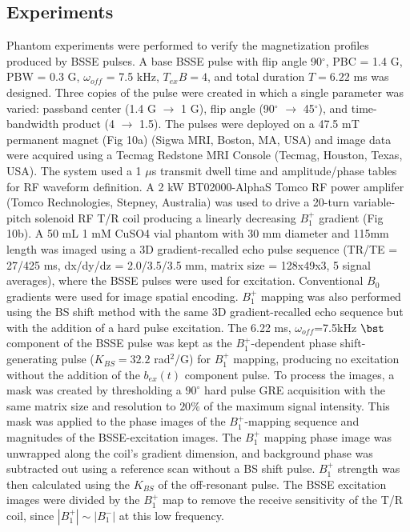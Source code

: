 \documentclass{article}
\newcommand{\bext}{b_{ex}(t)}
\begin{document}
\subsection*{Experiments}
Phantom experiments were performed to verify the magnetization profiles produced by BSSE pulses. 
A base BSSE pulse with flip angle 90$^\circ$, PBC = 1.4 G, PBW = 0.3 G, 
$\omega_{off}$ = 7.5 kHz, $T_{ex}B=4$, 
and total duration $T=6.22$ ms was designed. 
Three copies of the pulse were created in which a single parameter was varied: 
passband center (1.4 G $\rightarrow$ 1 G), 
flip angle (90$^\circ$ $\rightarrow$ 45$^\circ$), 
and time-bandwidth product (4 $\rightarrow$ 1.5). 
The pulses were deployed on a 47.5 mT permanent magnet (Fig 10a) (Sigwa MRI, Boston, MA, USA) and image data were 
acquired using a Tecmag Redstone MRI Console (Tecmag, Houston, Texas, USA). 
The system used a 1 $\mu$s transmit dwell time 
and amplitude/phase tables for RF waveform definition.
A 2 kW BT02000-AlphaS Tomco RF power amplifer (Tomco Rechnologies, Stepney, Australia) was used to drive a 20-turn variable-pitch solenoid RF T/R coil producing a linearly decreasing $B_1^+$ gradient (Fig 10b). 
A 50 mL 1 mM CuSO4 vial phantom with 30 mm diameter and 115mm length was imaged using a 3D gradient-recalled echo pulse sequence (TR/TE = 27/425 ms, dx/dy/dz = 2.0/3.5/3.5 mm, matrix size = 128x49x3, 5 signal averages),
where the BSSE pulses were used for excitation. 
Conventional $B_0$ gradients were used for image spatial encoding. 
$B_1^+$ mapping was also performed using the BS shift method \cite{Sacolick2010B1Shift}
with the same 3D gradient-recalled echo sequence but 
with the addition of a hard pulse excitation. 
The 6.22 ms, $\omega_{off}$=7.5kHz $\bst$ component of the BSSE pulse was kept as the $B_1^+$-dependent phase shift-generating pulse ($K_{BS}=32.2$ rad$^2$/G) 
for $B_1^+$ mapping, producing no excitation without the addition of the $\bext$ component pulse.
To process the images, a mask was created by thresholding a $90^\circ$ hard pulse GRE acquisition with the same matrix size and resolution to $20\%$ of the maximum signal intensity. 
This mask was applied to the phase images of the $B_1^+$-mapping sequence and magnitudes of the BSSE-excitation images. 
The $B_1^+$ mapping phase image was unwrapped along the coil's gradient dimension, 
and background phase was subtracted out using a reference scan without a BS shift pulse. 
$B_1^+$ strength was then calculated using the $K_{BS}$ of the off-resonant pulse. 
The BSSE excitation images were divided by the $B_1^+$ map to remove the receive sensitivity of the T/R coil,
since $|B_1^+| \sim |B_1^-|$ at this low frequency.
\end{document}
